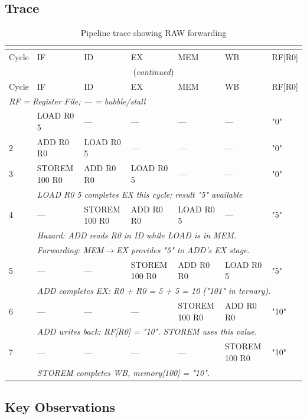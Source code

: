 \documentclass[12pt,a4paper,twoside]{book}
\theoremstyle{trinarytheorem}
\theoremstyle{trinarydefinition}
\newcommand{\code}[1]{\textsf{#1}}
\begin{document}
\subsection{Trace}

\begin{longtable}{l|l|l|l|l|l|l}
\caption{Pipeline trace showing RAW forwarding}
\label{tab:pipetrace} \\
\multicolumn{7}{c}{} \\
\toprule
Cycle & IF & ID & EX & MEM & WB & RF[R0] \\
\midrule
\endfirsthead
\multicolumn{7}{c}{(\emph{continued})} \\
\toprule
Cycle & IF & ID & EX & MEM & WB & RF[R0] \\
\midrule
\endhead
\bottomrule
\multicolumn{7}{l}{\emph{RF = Register File; --- = bubble/stall}} \\
\endfoot
1   & LOAD R0 5 & ---  & --- & --- & --- & \code{"0"} \\
2   & ADD R0 R0 & LOAD R0 5 & --- & --- & --- & \code{"0"} \\
3   & STOREM 100 R0 & ADD R0 R0 & LOAD R0 5 & --- & --- & \code{"0"} \\
    & \multicolumn{6}{l}{\emph{LOAD R0 5 completes EX this cycle; result "5" available}} \\
4   & --- & STOREM 100 R0 & ADD R0 R0 & LOAD R0 5 & --- & \code{"5"} \\
    & \multicolumn{6}{l}{\emph{Hazard: ADD reads R0 in ID while LOAD is in MEM.}} \\
    & \multicolumn{6}{l}{\emph{Forwarding: MEM$\rightarrow$EX provides "5" to ADD's EX stage.}} \\
5   & --- & --- & STOREM 100 R0 & ADD R0 R0 & LOAD R0 5 & \code{"5"} \\
    & \multicolumn{6}{l}{\emph{ADD completes EX: R0 + R0 = 5 + 5 = 10 ("101" in ternary).}} \\
6   & --- & --- & --- & STOREM 100 R0 & ADD R0 R0 & \code{"10"} \\
    & \multicolumn{6}{l}{\emph{ADD writes back: RF[R0] = "10". STOREM uses this value.}} \\
7   & --- & --- & --- & --- & STOREM 100 R0 & \code{"10"} \\
    & \multicolumn{6}{l}{\emph{STOREM completes WB, memory[100] = "10".}} \\
\bottomrule
\end{longtable}

\subsection{Key Observations}
\end{document}
